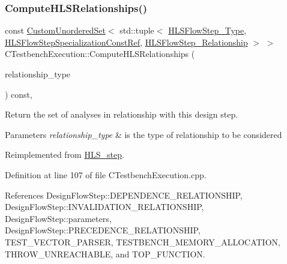 \subsubsection{\texorpdfstring{Compute\+H\+L\+S\+Relationships()}{ComputeHLSRelationships()}}
{\footnotesize\ttfamily const \hyperlink{classCustomUnorderedSet}{Custom\+Unordered\+Set}$<$ std\+::tuple$<$ \hyperlink{hls__step_8hpp_ada16bc22905016180e26fc7e39537f8d}{H\+L\+S\+Flow\+Step\+\_\+\+Type}, \hyperlink{hls__step_8hpp_a5fdd2edf290c196531d21d68e13f0e74}{H\+L\+S\+Flow\+Step\+Specialization\+Const\+Ref}, \hyperlink{hls__step_8hpp_a3ad360b9b11e6bf0683d5562a0ceb169}{H\+L\+S\+Flow\+Step\+\_\+\+Relationship} $>$ $>$ C\+Testbench\+Execution\+::\+Compute\+H\+L\+S\+Relationships (\begin{DoxyParamCaption}\item[{const \hyperlink{classDesignFlowStep_a723a3baf19ff2ceb77bc13e099d0b1b7}{Design\+Flow\+Step\+::\+Relationship\+Type}}]{relationship\+\_\+type }\end{DoxyParamCaption}) const\hspace{0.3cm}{\ttfamily [protected]}, {\ttfamily [virtual]}}



Return the set of analyses in relationship with this design step. 


\begin{DoxyParams}{Parameters}
{\em relationship\+\_\+type} & is the type of relationship to be considered \\
\hline
\end{DoxyParams}


Reimplemented from \hyperlink{classHLS__step_aed0ce8cca9a1ef18e705fc1032ad4de5}{H\+L\+S\+\_\+step}.



Definition at line 107 of file C\+Testbench\+Execution.\+cpp.



References Design\+Flow\+Step\+::\+D\+E\+P\+E\+N\+D\+E\+N\+C\+E\+\_\+\+R\+E\+L\+A\+T\+I\+O\+N\+S\+H\+IP, Design\+Flow\+Step\+::\+I\+N\+V\+A\+L\+I\+D\+A\+T\+I\+O\+N\+\_\+\+R\+E\+L\+A\+T\+I\+O\+N\+S\+H\+IP, Design\+Flow\+Step\+::parameters, Design\+Flow\+Step\+::\+P\+R\+E\+C\+E\+D\+E\+N\+C\+E\+\_\+\+R\+E\+L\+A\+T\+I\+O\+N\+S\+H\+IP, T\+E\+S\+T\+\_\+\+V\+E\+C\+T\+O\+R\+\_\+\+P\+A\+R\+S\+ER, T\+E\+S\+T\+B\+E\+N\+C\+H\+\_\+\+M\+E\+M\+O\+R\+Y\+\_\+\+A\+L\+L\+O\+C\+A\+T\+I\+ON, T\+H\+R\+O\+W\+\_\+\+U\+N\+R\+E\+A\+C\+H\+A\+B\+LE, and T\+O\+P\+\_\+\+F\+U\+N\+C\+T\+I\+ON.

\mbox{\label{classCTestbenchExecution_ac3b75ac39514d02be971318c2b9018e9}} 
